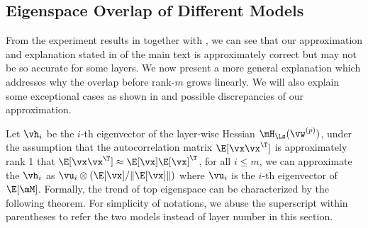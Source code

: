 \subsection{Eigenspace Overlap of Different Models}
\label{sec:appendix_model_overlap}
From the experiment results in  together with , we can see that our approximation and explanation stated in  of the main text is approximately correct but may not be so accurate for some layers.
We now present a more general explanation which addresses why the overlap before rank-$m$ grows linearly. We will also explain some exceptional cases as shown in  and possible discrepancies of our approximation.

Let $\vh_i$ be the $i$-th eigenvector of the layer-wise Hessian $\mH_\Ls(\vw^{(p)})$, under the assumption that the autocorrelation matrix $\E[\vx\vx^\T]$ is approximately rank 1 that $\E[\vx\vx^\T]\approx \E[\vx]\E[\vx]^\T$, for all $i \leq m$, we can approximate the $\vh_i$ as $\vu_i\otimes (\E[\vx]/\|\E[\vx]\|)$ where $\vu_i$ is the $i$-th eigenvector of $\E[\mM]$. Formally, the trend of top eigenspace can be characterized by the following theorem. For simplicity of notations, we abuse the superscript within parentheses to refer the two models instead of layer number in this section.

